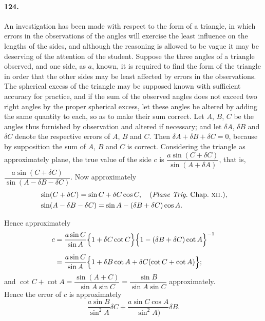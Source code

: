 \documentclass{book}[2004/02/16]
\begin{document}
\begin{mainmatter}
\begin{spacing}{1.3}
\paragraph{124.} An investigation has been made with respect to the
form of a triangle, in which errors in the observations of the
angles will exercise the least influence on the lengths of the sides,
and although the reasoning is allowed to be vague it may be
deserving of the attention of the student. Suppose the three
angles of a triangle observed, and one side, as $a$, known, it is
required to find the form of the triangle in order that the other
sides may be least affected by errors in the observations. The
spherical excess of the triangle may be supposed known with
sufficient accuracy for practice, and if the sum of the observed
angles does not exceed two right angles by the proper spherical
excess, let these angles be altered by adding the same quantity to
each, so as to make their sum correct. Let $A$, $B$, $C$ be the angles
thus furnished by observation and altered if necessary; and let
$\delta A$, $\delta B$ and $\delta C$ denote the respective errors of $A$, $B$ and $C$. Then
$\delta A + \delta B + \delta C = 0$, because by supposition the sum of $A$, $B$ and $C$
is correct. Considering the triangle as approximately plane, the
true value of the side $c$ is $\dfrac{a \sin (C + \delta C)}{\sin (A + \delta A)}$, that is, $\dfrac{a \sin (C + \delta C)}{\sin (A - \delta B - \delta C)}$.
Now approximately
\begin{align*}
& \sin (C + \delta C) = \sin C + \delta C \cos C,\quad
\text{(\textit{Plane Trig.}\ Chap.~\textsc{xii.})},
\\
& \sin (A - \delta B - \delta C) = \sin A - (\delta B + \delta C) \cos A.
\end{align*}

Hence approximately
\begin{align*}
c &= \frac{a \sin C}{\sin A}
     \Bigl\{1 + \delta C \cot C \Bigr\}
     \Bigl\{1 -(\delta B + \delta C) \cot A \Bigr\}^{-1}
\\[1.5ex]
  &= \frac{a \sin C}{\sin A}
     \Bigl\{1 + \delta B \cot A + \delta C (\cot C + \cot A) \Bigr\};
\end{align*}
and $\cot C + \cot A = \dfrac{\sin (A + C)}{\sin A \sin C} = \dfrac{\sin B}{\sin A \sin C}$ approximately.\\[1ex]

Hence the error of $c$ is approximately
\[
\frac{a \sin B}{\sin^2 A} \delta C + \frac{a \sin C \cos A}{\sin^2 A)} \delta B.
\]


\end{spacing}
\end{mainmatter}
\end{document}
